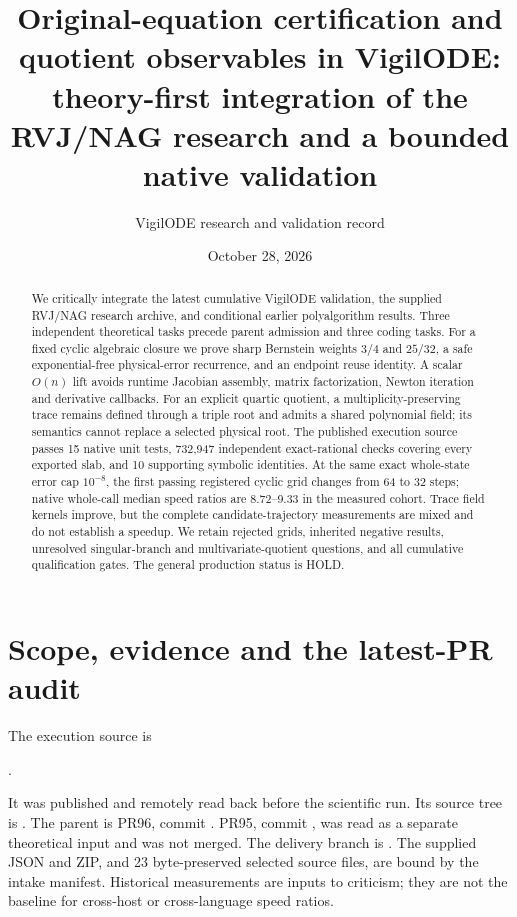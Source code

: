 \documentclass[aps,pra,reprint,onecolumn,10pt,notitlepage,nofootinbib]{revtex4-2}
\begin{document}
\title{Original-equation certification and quotient observables in VigilODE:\\
theory-first integration of the RVJ/NAG research and a bounded native validation}
\author{VigilODE research and validation record}
\noaffiliation
\date{October 28, 2026}
\begin{abstract}
We critically integrate the latest cumulative VigilODE validation, the supplied
RVJ/NAG research archive, and conditional earlier polyalgorithm results.
Three independent theoretical tasks precede parent admission and three coding
tasks. For a fixed cyclic algebraic closure we prove sharp Bernstein weights
$3/4$ and $25/32$, a safe exponential-free physical-error recurrence, and an
endpoint reuse identity. A scalar $O(n)$ lift avoids runtime Jacobian assembly,
matrix factorization, Newton iteration and derivative callbacks. For an explicit
quartic quotient, a multiplicity-preserving trace remains defined through a
triple root and admits a shared polynomial field; its semantics cannot replace
a selected physical root. The published execution source passes 15 native unit
tests, 732,947 independent exact-rational checks covering every exported slab,
and 10 supporting symbolic identities. At the same exact whole-state error cap
$10^{-8}$, the first passing registered cyclic grid changes from 64 to 32 steps;
native whole-call median speed ratios are 8.72--9.33 in the measured cohort.
Trace field kernels improve, but the complete candidate-trajectory measurements
are mixed and do not establish a speedup. We retain rejected grids, inherited
negative results, unresolved singular-branch and multivariate-quotient questions,
and all cumulative qualification gates. The general production status is HOLD.
\end{abstract}
\maketitle

\section{Scope, evidence and the latest-PR audit}

The execution source is
\begin{center}\small{}.\end{center}
It was published and remotely read back before the scientific run. Its source
tree is .
The parent is PR96, commit
.
PR95, commit ,
was read as a separate theoretical input and was not merged.
The delivery branch is .
The supplied JSON and ZIP, and 23 byte-preserved selected source files, are
bound by the intake manifest. Historical measurements are inputs to criticism;
they are not the baseline for cross-host or cross-language speed ratios.
\end{document}

